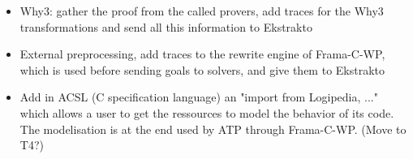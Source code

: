 \begin{workpackage}[id=atpetc,wphases=0-48,type=RTD,
  short=ATPs etc.,%
  title={ATP, SAT, SMT, Model checkers},
  lead=Lie,
  LieRM=10]
\begin{tasklist}
\begin{task}[id=cooperation, title=Make ATPs cooperate]
\begin{itemize}
\item Why3: gather the proof from the called provers, add traces for the
  Why3 transformations and send all this information to Ekstrakto
\item External preprocessing, add traces to the rewrite engine of
  Frama-C-WP, which is used before sending goals to solvers, and give
  them to Ekstrakto
\item Add in ACSL (C specification language) an "import from Logipedia,
  ..." which allows a user to get the ressources to model the behavior
  of its code. The modelisation is at the end used by ATP through
  Frama-C-WP. (Move to T4?)
\end{itemize}

\end{task}
\end{tasklist}







\end{workpackage}
